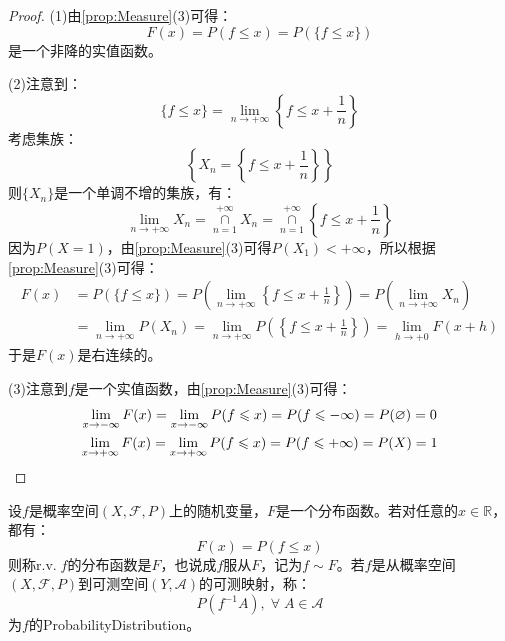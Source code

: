 \begin{proof}
	(1)由\cref{prop:Measure}(3)可得：
	\begin{equation*}
		F(x)=P(f\leqslant x)=P(\{f\leqslant x\})
	\end{equation*}
	是一个非降的实值函数。\par
	(2)注意到：
	\begin{equation*}
		\{f\leqslant x\}=\lim_{n\to+\infty}\left\{f\leqslant x+\frac{1}{n}\right\}
	\end{equation*}
	考虑集族：
	\begin{equation*}
		\left\{X_n=\left\{f\leqslant x+\frac{1}{n}\right\}\right\}
	\end{equation*}
	则$\{X_n\}$是一个单调不增的集族，有：
	\begin{equation*}
		\lim_{n\to+\infty}X_n=\underset{n=1}{\overset{+\infty}{\cap}}X_n=\underset{n=1}{\overset{+\infty}{\cap}}\left\{f\leqslant x+\frac{1}{n}\right\}
	\end{equation*}
	因为$P(X=1)$，由\cref{prop:Measure}(3)可得$P(X_1)<+\infty$，所以根据\cref{prop:Measure}(3)可得：
	\begin{align*}
		F(x)&=P(\{f\leqslant x\})
		=P\left(\lim_{n\to+\infty}\left\{f\leqslant x+\frac{1}{n}\right\}\right)
		=P\left(\lim_{n\to+\infty}X_n\right) \\
		&=\lim_{n\to+\infty}P(X_n)
		=\lim_{n\to+\infty}P\left(\left\{f\leqslant x+\frac{1}{n}\right\}\right)
		=\lim_{h\to+0}F(x+h)
	\end{align*}
	于是$F(x)$是右连续的。\par
	(3)注意到$f$是一个实值函数，由\cref{prop:Measure}(3)可得：
	\begin{gather*}
		\lim_{x\to-\infty}F(x)=\lim_{x\to-\infty}P(f\leqslant x)=P(f\leqslant-\infty)=P(\varnothing)=0 \\
		\lim_{x\to+\infty}F(x)=\lim_{x\to+\infty}P(f\leqslant x)=P(f\leqslant+\infty)=P(X)=1\qedhere
	\end{gather*}
\end{proof}
\begin{definition}
	设$f$是概率空间$(X,\mathscr{F},P)$上的随机变量，$F$是一个分布函数。若对任意的$x\in\mathbb{R}$，都有：
	\begin{equation*}
		F(x)=P(f\leqslant x)
	\end{equation*}
	则称r.v.$\;f$的分布函数是$F$，也说成$f$服从$F$，记为$f\sim F$。若$f$是从概率空间$(X,\mathscr{F},P)$到可测空间$(Y,\mathscr{A})$的可测映射，称：
	\begin{equation*}
		P(f^{-1}A),\;\forall\;A\in \mathscr{A}
	\end{equation*}
	为$f$的\gls{ProbabilityDistribution}。
\end{definition}
